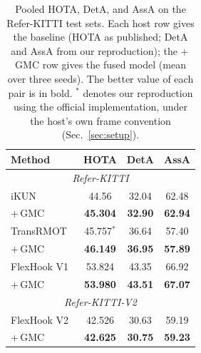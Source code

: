 \documentclass{article}
\providecommand{\DIFadd}[1]{{\protect\color{blue}\uwave{#1}}} %
\providecommand{\DIFaddbegin}{} %
\providecommand{\DIFaddend}{} %
\providecommand{\DIFaddFL}[1]{\DIFadd{#1}} %
\providecommand{\DIFaddincludegraphics}[2][]{{\color{blue}\fbox{\DIFOincludegraphics[#1]{#2}}}} %
\DeclareRobustCommand{\DIFaddbegin}{\DIFOaddbegin \let\includegraphics\DIFaddincludegraphics} %
\DeclareRobustCommand{\DIFaddend}{\DIFOaddend \let\includegraphics\DIFOincludegraphics} %
\begin{document}
\DIFaddbegin \begin{table}[t]
  \centering
  \caption{\DIFaddFL{[changed] }Pooled HOTA, DetA, and AssA on the Refer-KITTI test sets. Each host row gives the baseline (HOTA as published; DetA and AssA from our reproduction); the +\,GMC row gives the fused model (mean over three seeds). The better value of each pair is in bold. $^*$ denotes our reproduction using the official implementation, under the host's own frame convention (Sec.~\ref{sec:setup}).}
  \label{tab:main}
  \footnotesize
  \begin{tabular*}{\linewidth}{@{\extracolsep{\fill}}lccc}
    \hline
    Method                      & HOTA               & DetA  & AssA  \\
    \hline
    \multicolumn{4}{c}{\textit{Refer-KITTI}} \\
    \hline
    iKUN~\cite{ikun}            & 44.56              & 32.04 & 62.48 \\
    \quad +\,GMC                & \textbf{45.304} & \textbf{32.90} & \textbf{62.94} \\
    \hline
    TransRMOT~\cite{transrmot}  & 45.757$^*$         & 36.64 & 57.40 \\
    \quad +\,GMC                & \textbf{46.149} & \textbf{36.95} & \textbf{57.89} \\
    \hline
    FlexHook V1~\cite{flexhook} & 53.824             & 43.35 & 66.92 \\
    \quad +\,GMC                & \textbf{53.980} & \textbf{43.51} & \textbf{67.07} \\
    \hline
    \multicolumn{4}{c}{\textit{Refer-KITTI-V2}} \\
    \hline
    FlexHook V2~\cite{flexhook} & 42.526             & 30.63 & 59.19 \\
    \quad +\,GMC                & \textbf{42.625} & \textbf{30.75} & \textbf{59.23} \\
    \hline
  \end{tabular*}
\end{table}
\DIFaddend 
\end{document}
